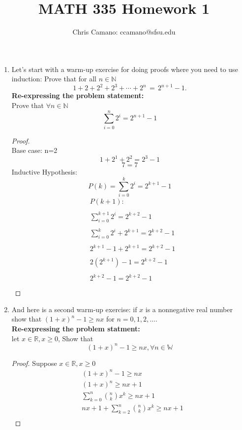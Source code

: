 \documentclass[11pt]{article}
\author{Chris Camano: ccamano@sfsu.edu}
\title{MATH 335  Homework 1 }
\date
\theoremstyle{definition}  %
\newcommand{\N}{\mathbb{N}}
\newcommand{\R}{\mathbb{R}}
\begin{document}
\maketitle
\begin{enumerate}

\item Let's start with a warm-up exercise for doing proofs where you need to use induction:  Prove that for all $n \in \N$
  $$ 1 + 2 + 2^2 + 2^3 + \cdots + 2^n \, = \, 2^{n+1} - 1.$$
  \textbf{Re-expressing the problem statement: }\\
  Prove that $\forall n \in \N$
  \[
    \sum_{i=0}^n2^i=2^{n+1}-1
  \]
  \begin{proof}\\
    Base case: n=2\\
    $$1+2^1+2^2=2^3-1$$
    $$7=7$$
    Inductive Hypothesis: \\
    $$P(k)=  \sum_{i=0}^k2^i=2^{k+1}-1$$
    \begin{align*}
      &P(k+1):\\\\
      &\sum_{i=0}^{k+1}2^i=2^{k+2}-1\\\\
      &\sum_{i=0}^{k}2^i+2^{k+1}=2^{k+2}-1\\\\
      &2^{k+1}-1+2^{k+1}=2^{k+2}-1\\\\
        &2(2^{k+1})-1=2^{k+2}-1\\\\
          &2^{k+2}-1=2^{k+2}-1\\\\
    \end{align*}
  \end{proof}
\item And here is a second warm-up exercise: if $x$ is a nonnegative real number show that $(1 + x)^n - 1 \geq nx$ for $n=0, 1, 2, \ldots$.\\
\textbf{Re-expressing the problem statment:}\\
let $x\in \R, x\geq 0$, Show that
\[
  (1 + x)^n - 1 \geq nx, \forall n \in \mathbb{W}
\]
\begin{proof}
  Suppose  $x\in \R, x\geq 0$
\begin{align*}
  &(1 + x)^n - 1 \geq nx\\
  &(1 + x)^n\geq nx+1\\
  &\sum_{k=0}^n\binom{n}{k}x^k\geq nx+1\\
  &nx+1+\sum_{k=2}^n\binom{n}{k}x^k\geq nx+1\\

\end{align*}
\end{proof}
\end{enumerate}
\end{document}
